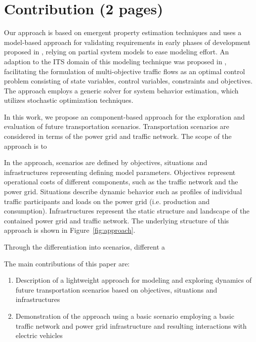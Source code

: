 \section{Contribution (2 pages)}

Our approach is based on emergent property estimation techniques \cite{hackenberg2012towards} and uses a model-based approach for validating requirements in early phases of development proposed in \cite{hackenberg2014rapid}, relying on partial system models to ease modeling effort. An adaption to the ITS domain of this modeling technique was proposed in \cite{ascher2014early}, facilitating the formulation of multi-objective traffic flows as an optimal control problem consisting of state variables, control variables, constraints and objectives. The approach employs a generic solver for system behavior estimation, which utilizes stochastic optimization techniques.

In this work, we propose an component-based approach for the exploration and evaluation of future transportation scenarios. Transportation scenarios are considered in terms of the power grid and traffic network. The scope of the approach is to 

In the approach, scenarios are defined by objectives, situations and infrastructures representing defining model parameters. Objectives represent operational costs of different components, such as the traffic network and the power grid. Situations describe dynamic behavior such as profiles of individual traffic participants and loads on the power grid (i.e. production and consumption). Infrastructures represent the static structure and landscape of the contained power grid and traffic network. The underlying structure of this approach is shown in Figure~\ref{fig:approach}.

Through the differentiation into scenarios, different a


The main contributions of this paper are:

\begin{enumerate}
	\item Description of a lightweight approach for modeling and exploring dynamics of future
	transportation scenarios based on objectives, situations and infrastructures
	\item Demonstration of the approach using a basic scenario employing a basic traffic network and power grid infrastructure
	and resulting interactions with electric vehicles
\end{enumerate}

